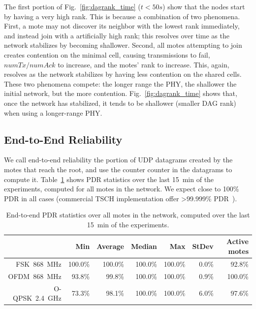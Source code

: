 \documentclass[sensors,article,submit,moreauthors,pdftex]{Definitions/mdpi}
\newcommand{\fsk}           {FSK~868~MHz}
\newcommand{\oqpsk}         {O-QPSK~2.4~GHz}
\newcommand{\ofdm}          {OFDM~868~MHz}
\begin{document}
The first portion of Fig.~\ref{fig:dagrank_time} ($t<50s$) show that the nodes start by having a very high rank.
This is because a combination of two phenomena.
First, a mote may not discover its neighbor with the lowest rank immediately, and instead join with a artificially high rank; this resolves over time as the network stabilizes by becoming shallower.
Second, all motes attempting to join creates contention on the minimal cell, causing
    transmissions to fail,
    $numTx/numAck$ to increase, and
    the motes' rank to increase.
This, again, resolves as the network stabilizes by having less contention on the shared cells.
These two phenomena compete: the longer range the PHY, the shallower the initial network, but the more contention.
Fig.~\ref{fig:dagrank_time} shows that, once the network has stabilized, it tends to be shallower (smaller DAG rank) when using a longer-range PHY.

\subsection{End-to-End Reliability}
\label{sec:res_reliability}


We call end-to-end reliability the portion of UDP datagrams created by the motes that reach the root, and use the counter counter in the datagrams to compute it.
Table~\ref{tab:pdr_table} shows PDR statistics over the last 15~min of the experiments, computed for all motes in the network.
We expect close to 100\% PDR in all cases (commercial TSCH implementation offer >99.999\% PDR~\cite{vucinic20key}).

\begin{table}
    \centering
    \begin{tabular}{|r|r|r|r|r|r|r|}
        \hline
                &      Min &  Average &   Median &      Max &  StDev & Active motes \\ \hline
        \fsk    &  100.0\% &  100.0\% &  100.0\% &  100.0\% &  0.0\% &       92.8\% \\ \hline
        \ofdm   &   93.8\% &   99.8\% &  100.0\% &  100.0\% &  0.9\% &      100.0\% \\ \hline
        \oqpsk  &   73.3\% &   98.1\% &  100.0\% &  100.0\% &  6.0\% &       97.6\% \\ \hline
    \end{tabular}
    \caption{End-to-end PDR statistics over all motes in the network, computed over the last 15~min of the experiments.}
    \label{tab:pdr_table}
\end{table}
\end{document}
